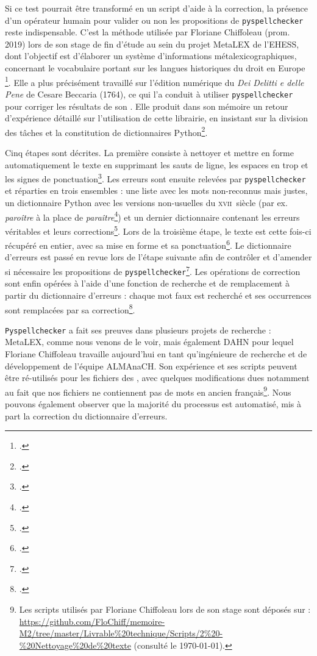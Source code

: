 Si ce test pourrait être transformé en un script d'aide à la correction, la présence d'un opérateur humain pour valider ou non les propositions de \texttt{pyspellchecker} reste indispensable. C'est la méthode utilisée par Floriane Chiffoleau (prom. 2019) lors de son stage de fin d'étude au sein du projet MetaLEX de l'EHESS, dont l'objectif est \og d’élaborer un système d’informations métalexicographiques,
concernant le vocabulaire portant sur les langues historiques du droit en Europe \fg\footcite[p. 9]{chiffoleau}. Elle a plus précisément travaillé sur l'édition numérique du \textit{Dei Delitti e delle Pene} de Cesare Beccaria (1764), ce qui l'a conduit à utiliser \texttt{pyspellchecker} pour corriger les résultats de son \ocr. Elle produit dans son mémoire un retour d'expérience détaillé sur l'utilisation de cette librairie, en insistant sur la division des tâches et la constitution de dictionnaires Python\footcite[chap. 8, \textit{Établir une correction orthographique et une annotation linguistique semi-automatique}, p. 57-66]{chiffoleau}.

Cinq étapes sont décrites. La première consiste à nettoyer et mettre en forme automatiquement le texte en supprimant les sauts de ligne, les espaces en trop et les signes de ponctuation\footcite[p. 54 et 60]{chiffoleau}. Les erreurs sont ensuite relevées par \texttt{pyspellchecker} et réparties en trois ensembles : une liste avec les mots non-reconnus mais justes, un dictionnaire Python avec les versions non-usuelles du \textsc{xvii}\ieme~siècle (par ex. \textit{paroître} à la place de \textit{paraître}\footcite[p. 57]{chiffoleau}) et un dernier dictionnaire contenant les erreurs véritables et leurs corrections\footcite[p. 59-60]{chiffoleau}. Lors de la troisième étape, le texte est cette fois-ci récupéré en entier, avec sa mise en forme et sa ponctuation\footcite[p. 61]{chiffoleau}. Le dictionnaire d'erreurs est passé en revue lors de l'étape suivante afin de contrôler et d'amender si nécessaire les propositions de \texttt{pyspellchecker}\footcite[p. 61-63]{chiffoleau}. Les opérations de correction sont enfin opérées à l'aide d'une fonction de recherche et de remplacement à partir du dictionnaire d'erreurs : chaque mot faux est recherché et ses occurrences sont remplacées par sa correction\footcite[p. 63-64]{chiffoleau}.

\texttt{Pyspellchecker} a  fait ses preuves dans plusieurs projets de recherche : MetaLEX, comme nous venons de le voir, mais également DAHN pour lequel Floriane Chiffoleau travaille aujourd'hui en tant qu'ingénieure de recherche et de développement de l'équipe ALMAnaCH. Son expérience et ses scripts peuvent être ré-utilisés pour les fichiers des \odm{}, avec quelques modifications dues notamment au fait que nos fichiers ne contiennent pas de mots en ancien français\footnote{Les scripts utilisés par Floriane Chiffoleau lors de son stage sont déposés sur \github{} : \url{https://github.com/FloChiff/memoire-M2/tree/master/Livrable\%20technique/Scripts/2\%20-\%20Nettoyage\%20de\%20texte} (consulté le \today).}. Nous pouvons également observer que la majorité du processus est automatisé, mis à part la correction du dictionnaire d'erreurs.

